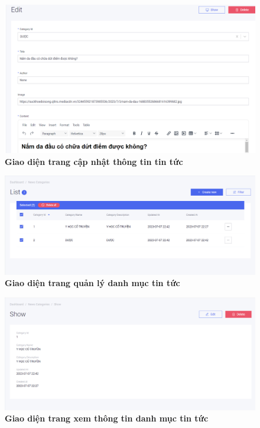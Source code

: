 \begin{figure}[H]
  \centering
  \includegraphics[scale=0.5]{Images/server/webUI/news_edit.PNG}
  \caption[Giao diện trang cập nhật thông tin tin tức]{\bfseries \fontsize{12pt}{0pt}\selectfont Giao diện trang cập nhật thông tin tin tức}
  \label{news_show} %
\end{figure}


\begin{figure}[H]
  \centering
  \includegraphics[scale=0.5]{Images/server/webUI/news_category_list.PNG}
  \caption[Giao diện trang quản lý danh mục tin tức]{\bfseries \fontsize{12pt}{0pt}\selectfont Giao diện trang quản lý danh mục tin tức}
  \label{news_category_list} %
\end{figure}


\begin{figure}[H]
  \centering
  \includegraphics[scale=0.5]{Images/server/webUI/news_category_show.PNG}
  \caption[Giao diện trang xem thông tin danh mục tin tức]{\bfseries \fontsize{12pt}{0pt}\selectfont Giao diện trang xem thông tin danh mục tin tức}
  \label{news_category_show} %
\end{figure}


